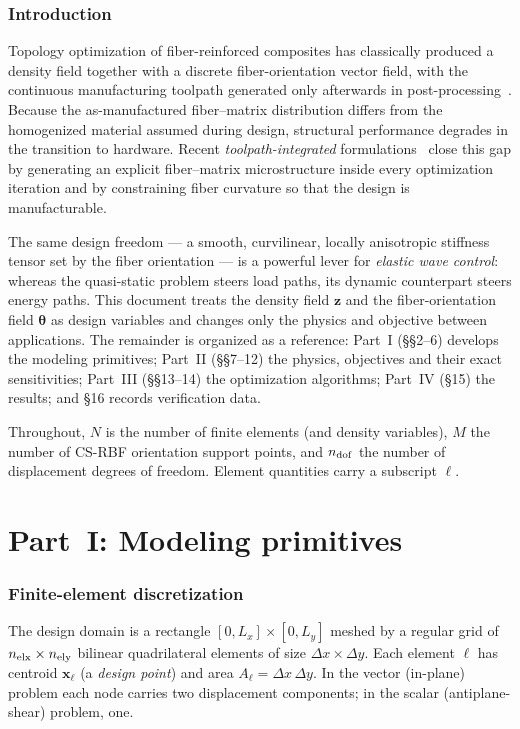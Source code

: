 \documentclass[11pt]{article}
\newcommand{\vth}{\bm{\theta}}
\newcommand{\vz}{\mathbf{z}}
\begin{document}
\tableofcontents

\section{Introduction}
Topology optimization of fiber-reinforced composites has classically produced a
density field together with a discrete fiber-orientation vector field, with the
continuous manufacturing toolpath generated only afterwards in
post-processing~\cite{wong2025,ren2024}. Because the as-manufactured
fiber--matrix distribution differs from the homogenized material assumed during
design, structural performance degrades in the transition to hardware. Recent
\emph{toolpath-integrated} formulations~\cite{wong2026,ren2024} close this gap by
generating an explicit fiber--matrix microstructure inside every optimization
iteration and by constraining fiber curvature so that the design is
manufacturable.

The same design freedom --- a smooth, curvilinear, locally anisotropic stiffness
tensor set by the fiber orientation --- is a powerful lever for \emph{elastic wave
control}: whereas the quasi-static problem steers load paths, its dynamic
counterpart steers energy paths. This document treats the density field $\vz$ and
the fiber-orientation field $\vth$ as design variables and changes only the
physics and objective between applications. The remainder is organized as a
reference: Part~I (\S\S2--6) develops the modeling primitives; Part~II
(\S\S7--12) the physics, objectives and their exact sensitivities; Part~III
(\S\S13--14) the optimization algorithms; Part~IV (\S15) the results; and \S16
records verification data.

Throughout, $N$ is the number of finite elements (and density variables), $M$ the
number of CS-RBF orientation support points, and $n_{\rm dof}$ the number of
displacement degrees of freedom. Element quantities carry a subscript $\ell$.

\part*{Part~I: Modeling primitives}

\section{Finite-element discretization}
The design domain is a rectangle $[0,L_x]\times[0,L_y]$ meshed by a regular grid
of $n_{\rm elx}\times n_{\rm ely}$ bilinear quadrilateral elements of size
$\Delta x\times\Delta y$. Each element $\ell$ has centroid $\mathbf{x}_\ell$
(a \emph{design point}) and area $A_\ell=\Delta x\,\Delta y$. In the vector
(in-plane) problem each node carries two displacement components; in the scalar
(antiplane-shear) problem, one.
\end{document}
